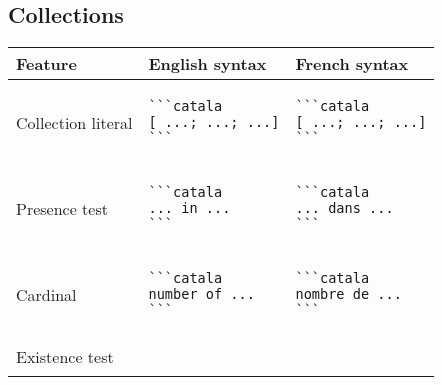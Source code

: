\documentclass[a3paper,landscape]{article}
\begin{document}
\begin{multicols*}{2}
  \section*{Collections}
  \begin{center}
    \begin{tabular}{p{}p{}p{}}
      \toprule
      Feature            & English syntax & French syntax \\\midrule
      Collection literal &
      \vspace*{-1.75em}
      \begin{verbatim}
```catala
[ ...; ...; ...]
```
\end{verbatim}
      \vspace*{-1.75em}
                         &
      \vspace*{-1.75em}
      \begin{verbatim}
```catala
[ ...; ...; ...]
```
\end{verbatim}
      \vspace*{-1.75em}
      \\
      Presence test      &
      \vspace*{-1.75em}
      \begin{verbatim}
```catala
... in ...
```
\end{verbatim}
      \vspace*{-1.75em}
                         &
      \vspace*{-1.75em}
      \begin{verbatim}
```catala
... dans ...
```
\end{verbatim}
      \vspace*{-1.75em}
      \\
      Cardinal           &
      \vspace*{-1.75em}
      \begin{verbatim}
```catala
number of ...
```
\end{verbatim}
      \vspace*{-1.75em}
                         &
      \vspace*{-1.75em}
      \begin{verbatim}
```catala
nombre de ...
```
\end{verbatim}
      \vspace*{-1.75em}
      \\
      Existence test     &
      \vspace*{-1.75em}
      \begin{verbatim}

\end{verbatim}
\end{tabular}
\end{center}
\end{multicols*}
\end{document}
